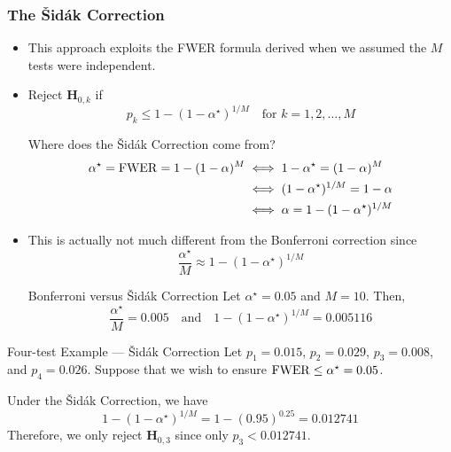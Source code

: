 \subsubsection*{The Šidák Correction}
\begin{itemize}
      \item This approach exploits the FWER formula derived when we assumed the $M$ tests were independent.
      \item Reject $ \mathbf{H}_{0,k} $ if
            \[ p_k\le 1-(1-\alpha^\star)^{1/M}\quad\text{for }k=1,2,\ldots,M \]
            \begin{Remark}{}{}
                  Where does the Šidák Correction come from?
                  \begin{align*}
                        \alpha^\star=\operatorname{FWER}=1-(1-\alpha)^M
                         & \iff 1-\alpha^\star = (1-\alpha)^M   \\
                         & \iff (1-\alpha^\star)^{1/M}=1-\alpha \\
                         & \iff \alpha=1-(1-\alpha^\star)^{1/M} \\
                  \end{align*}
            \end{Remark}
      \item This is actually not much different from the Bonferroni correction since
            \[ \frac{\alpha^\star}{M} \approx 1-(1-\alpha^\star)^{1/M} \]
            \begin{Example}{Bonferroni versus Šidák Correction}{}
                  Let $ \alpha^\star=0.05 $ and $ M=10 $. Then,
                  \[ \frac{\alpha^\star}{M} =0.005\quad\text{and}\quad 1-(1-\alpha^\star)^{1/M}=0.005116 \]
            \end{Example}
\end{itemize}
\begin{Example}{Four-test Example --- Šidák Correction}{}
      Let $ p_1=0.015 $, $ p_2=0.029 $, $ p_3=0.008 $, and $ p_4=0.026 $. Suppose that we wish to ensure
      $ \operatorname{FWER}\le \alpha^\star=0.05 $.

      \vspace{2mm}

      Under the Šidák Correction, we have
      \[ 1-(1-\alpha^\star)^{1/M}=1-(0.95)^{0.25}=0.012741 \]
      Therefore, we only reject $ \mathbf{H}_{0,3} $ since only $ p_3<0.012741 $.
\end{Example}
